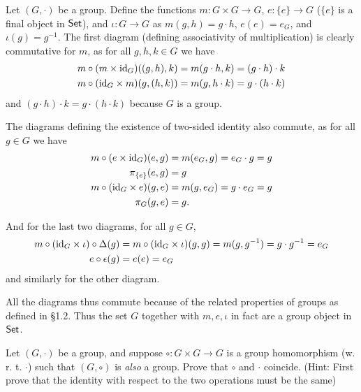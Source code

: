 \begin{solution}
	Let $(G, \cdot)$ be a group. Define the functions $m: G \times G \to G$, $e: \{e\} \to G$ ($\{e\}$ is a final object in $\mathsf{Set}$), and $\iota: G \to G$ as $m(g, h) = g \cdot h$, $e(e) = e_G$, and $\iota(g) = g^{-1}$. The first diagram (defining associativity of multiplication) is clearly commutative for $m$, as for all $g, h, k \in G$ we have
	\begin{align*}
		m \circ (m \times \mathrm{id}_G) ((g, h), k) &= m(g \cdot h, k) = (g \cdot h) \cdot k \\
		m \circ (\mathrm{id}_G \times m) (g, (h, k)) &= m(g, h \cdot k) = g \cdot (h \cdot k)
	\end{align*}
	and $(g \cdot h) \cdot k = g \cdot (h \cdot k)$ because $G$ is a group.

	The diagrams defining the existence of two-sided identity also commute, as for all $g \in G$ we have
	\begin{align*}
		m \circ (e \times \mathrm{id}_G)(e, g) &= m(e_G, g) = e_G \cdot g = g \\
		\pi_{\{e\}}(e, g) &= g \\
		m \circ (\mathrm{id}_G \times e)(g,e) &= m(g, e_G) = g \cdot e_G = g \\
		\pi_G(g, e) &= g \text{.}
	\end{align*}

	And for the last two diagrams, for all $g \in G$,
	\begin{align*}
		m \circ (\mathrm{id}_G \times \iota) \circ \Delta(g) &= m \circ (\mathrm{id}_G \times \iota)(g, g) = m(g, g^{-1}) = g \cdot g^{-1} = e_G \\
		e \circ \epsilon(g) &= e(e) = e_G
	\end{align*}
	and similarly for the other diagram.
	
	All the diagrams thus commute because of the related properties of groups as defined in \S 1.2. Thus the set $G$ together with $m, e, \iota$ in fact are a group object in $\mathsf{Set}$.
\end{solution}

\begin{problem}
	Let $(G, \cdot)$ be a group, and suppose $\circ: G \times G \to G$ is a group homomorphism (w. r. t. $\cdot$) such that $(G, \circ)$ is \emph{also} a group. Prove that $\circ$ and $\cdot$ coincide. (Hint: First prove that the identity with respect to the two operations must be the same)
\end{problem}

